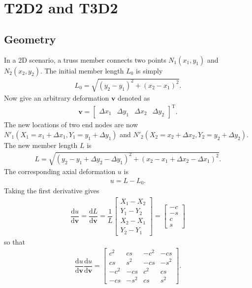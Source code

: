 \documentclass[11pt]{article}
\begin{document}
\section{T2D2 and T3D2}
\subsection{Geometry}
In a 2D scenario, a truss member connects two points $N_1(x_1,y_1)$ and $N_2(x_2,y_2)$. The initial member length $L_0$ is simply
\begin{gather}
L_0=\sqrt{(y_2-y_1)^2+(x_2-x_1)^2}.
\end{gather}
Now give an arbitrary deformation $\mathbf{v}$ denoted as
\begin{gather}
\mathbf{v}=\begin{bmatrix}
\Delta{}x_1&\Delta{}y_1&\Delta{}x_2&\Delta{}y_2
\end{bmatrix}^\mathrm{T}.
\end{gather}
The new locations of two end nodes are now $N'_1(X_1=x_1+\Delta{}x_1,Y_1=y_1+\Delta{}y_1)$ and $N'_2(X_2=x_2+\Delta{}x_2,Y_2=y_2+\Delta{}y_2)$. The new member length $L$ is
\begin{gather}
L=\sqrt{(y_2-y_1+\Delta{}y_2-\Delta{}y_1)^2+(x_2-x_1+\Delta{}x_2-\Delta{}x_1)^2}.
\end{gather}
The corresponding axial deformation $u$ is
\begin{gather}
u=L-L_0.
\end{gather}
Taking the first derivative gives
\begin{gather}
\dfrac{\mathrm{d}u}{\mathrm{d}\mathbf{v}}=\dfrac{\mathrm{d}L}{\mathrm{d}\mathbf{v}}=\dfrac{1}{L}\begin{bmatrix}
X_1-X_2\\Y_1-Y_2\\X_2-X_1\\Y_2-Y_1
\end{bmatrix}=\begin{bmatrix}
-c\\-s\\c\\s
\end{bmatrix}
\end{gather}
so that
\begin{gather}
\dfrac{\mathrm{d}u}{\mathrm{d}\mathbf{v}}\dfrac{\mathrm{d}u}{\mathrm{d}\mathbf{v}}=\begin{bmatrix}
	c^2  & cs   & -c^2 & -cs  \\
	cs   & s^2  & -cs  & -s^2 \\
	-c^2 & -cs  & c^2  & cs   \\
	-cs  & -s^2 & cs   & s^2
\end{bmatrix}.
\end{gather}
\end{document}
